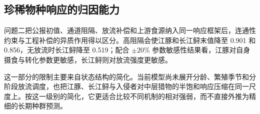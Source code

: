\subsection{珍稀物种响应的归因能力}
问题二把公报初值、通道阻隔、放流补偿和上游食源纳入同一响应框架后，连通性约束与工程补偿的异质作用得以区分。高阻隔会使江豚和长江鲟末值降至 0.901 和 0.856，无放流时长江鲟降至 0.519；配合 $\pm 20\%$ 参数敏感性结果看，江豚对自身摄食与转化参数更敏感，长江鲟则对放流强度更敏感。

这一部分的限制主要来自状态结构的简化。当前模型尚未展开分龄、繁殖季节和分阶段放流调度，也把江豚、长江鲟与入侵者对中层猎物的半饱和响应压缩在同一尺度上。按这一级别的简化，它更适合比较不同机制的相对强弱，而不直接外推为精细的长期种群预测。

